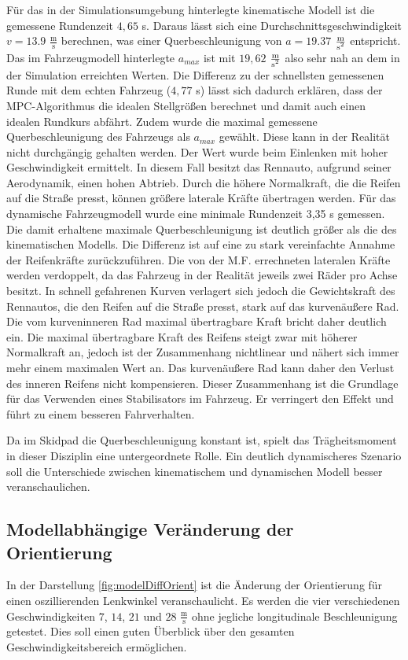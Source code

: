 \documentclass{like}
\begin{document}
Für das in der Simulationsumgebung hinterlegte kinematische Modell ist die gemessene Rundenzeit $4,65$ s. Daraus lässt sich eine Durchschnittsgeschwindigkeit $ v= 13.9$ $ \frac{\text{m}}{\text{s}}$ berechnen, was einer Querbeschleunigung von $a = 19.37$ $ \frac{\text{m}}{\text{s\textsuperscript{2}}}$ entspricht. Das im Fahr\-zeug\-mo\-dell hinterlegte $a_{max}$ ist mit $19,62$ $ \frac{\text{m}}{\text{s\textsuperscript{2}}}$ also sehr nah an dem in der Simulation erreichten Werten. Die Differenz zu der schnellsten gemessenen Runde mit dem echten Fahrzeug ($4,77$ s) lässt sich dadurch erklären, dass der MPC-Algorithmus die idealen Stellgrößen berechnet und damit auch einen idealen Rundkurs abfährt. Zudem wurde die maximal gemessene Querbeschleunigung des Fahrzeugs als $a_{max}$ gewählt. Diese kann in der Realität nicht durchgängig gehalten werden. Der Wert wurde beim Einlenken mit hoher Geschwindigkeit ermittelt. In diesem Fall besitzt das Rennauto, aufgrund seiner Aerodynamik, einen hohen Abtrieb. Durch die höhere Normalkraft, die die Reifen auf die Straße presst, können größere laterale Kräfte übertragen werden.
Für das dynamische Fahrzeugmodell wurde eine minimale Rundenzeit 3,35 s gemessen.  Die damit erhaltene maximale Querbeschleunigung ist deutlich größer als die des kinematischen Modells. Die Differenz ist auf eine zu stark vereinfachte Annahme der Reifenkräfte zurückzuführen. Die von der \ac{M.F.} errechneten lateralen Kräfte werden verdoppelt, da das Fahrzeug in der Realität jeweils zwei Räder pro Achse besitzt. In schnell gefahrenen Kurven verlagert sich jedoch die Gewichtskraft des Rennautos, die den Reifen auf die Straße presst, stark auf das kurvenäußere Rad. Die vom kurveninneren Rad maximal übertragbare Kraft bricht daher deutlich ein.
Die maximal übertragbare Kraft des Reifens steigt zwar mit höherer Normalkraft an, jedoch ist der Zusammenhang nichtlinear und nähert sich immer mehr einem maximalen Wert an. Das kurvenäußere Rad kann daher den Verlust des inneren Reifens nicht kompensieren. Dieser Zusammenhang ist die Grundlage für das Verwenden eines Stabilisators im Fahrzeug. Er verringert den Effekt und führt zu einem besseren Fahrverhalten.

Da im Skidpad die Querbeschleunigung konstant ist, spielt das Trägheitsmoment in dieser Disziplin eine untergeordnete Rolle.
Ein deutlich dynamischeres Szenario soll die Unterschiede zwischen kinematischem und dynamischen Modell besser veranschaulichen.

\subsection{Modellabhängige Veränderung der Orientierung}
In der Darstellung \ref{fig:modelDiffOrient} ist die Änderung der Orientierung für einen oszillierenden Lenkwinkel veranschaulicht. Es werden die vier verschiedenen Geschwindigkeiten $7$, $14$, $21$ und $28$ $\frac{\text{m}}{\text{s}}$ ohne jegliche longitudinale Beschleunigung getestet. Dies soll einen guten Überblick über den gesamten Geschwindigkeitsbereich ermöglichen.
\end{document}
